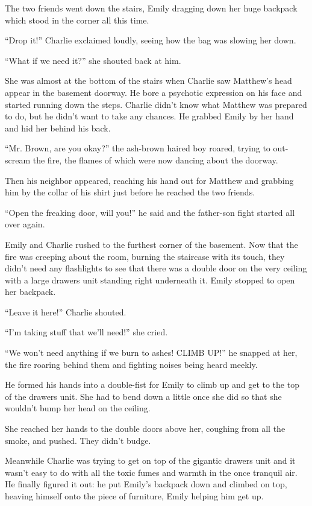 The two friends went down the stairs, Emily dragging down her huge backpack which stood in the corner all this time.

“Drop it!” Charlie exclaimed loudly, seeing how the bag was slowing her down.

“What if we need it?” she shouted back at him.

She was almost at the bottom of the stairs when Charlie saw Matthew's head appear in the basement doorway. He bore a psychotic expression on his face and started running down the steps. Charlie didn't know what Matthew was prepared to do, but he didn't want to take any chances. He grabbed Emily by her hand and hid her behind his back.

“Mr. Brown, are you okay?” the ash-brown haired boy roared, trying to out-scream the fire, the flames of which were now dancing about the doorway.

Then his neighbor appeared, reaching his hand out for Matthew and grabbing him by the collar of his shirt just before he reached the two friends.

“Open the freaking door, will you!” he said and the father-son fight started all over again.

Emily and Charlie rushed to the furthest corner of the basement. Now that the fire was creeping about the room, burning the staircase with its touch, they didn't need any flashlights to see that there was a double door on the very ceiling with a large drawers unit standing right underneath it. Emily stopped to open her backpack.

“Leave it here!” Charlie shouted.

“I'm taking stuff that we'll need!” she cried.

“We won't need anything if we burn to ashes! CLIMB UP!” he snapped at her, the fire roaring behind them and fighting noises being heard meekly.

He formed his hands into a double-fist for Emily to climb up and get to the top of the drawers unit. She had to bend down a little once she did so that she wouldn't bump her head on the ceiling.

She reached her hands to the double doors above her, coughing from all the smoke, and pushed. They didn't budge.

Meanwhile Charlie was trying to get on top of the gigantic drawers unit and it wasn't easy to do with all the toxic fumes and warmth in the once tranquil air. He finally figured it out: he put Emily's backpack down and climbed on top, heaving himself onto the piece of furniture, Emily helping him get up.

